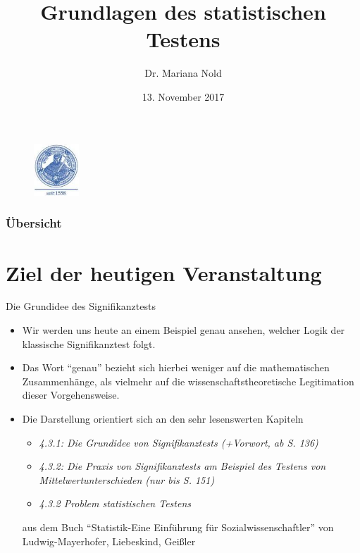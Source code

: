 \documentclass[usenames,dvipsnames,handout]{beamer}
\begin{document}
\author[Dr. Mariana Nold]{Dr. Mariana Nold}
 \date{}
\title [Grundlagen des statistischen Testens]{Grundlagen des statistischen Testens}
\date{13. November 2017}
\begin{frame}
\maketitle

  \begin{figure}[ht]
 	\centering
 	      \includegraphics[width=0.15\textwidth]{index.jpeg}
 	\end{figure}
\end{frame} 

\begin{frame}
  \frametitle{Übersicht}
  \tableofcontents
\end{frame}

\section{Ziel der heutigen Veranstaltung }


\begin{frame}{Die Grundidee des Signifikanztests}
\begin{itemize}
\item{Wir werden uns heute an einem Beispiel  genau ansehen, welcher Logik der klassische
Signifikanztest folgt. }\pause
\item{Das Wort ``genau'' bezieht sich hierbei weniger auf die mathematischen
Zusammenhänge, als vielmehr auf die wissenschaftstheoretische Legitimation dieser Vorgehensweise.}\pause
\item{Die Darstellung orientiert sich an den sehr lesenswerten Kapiteln 
\begin{itemize}
\item{\textit{4.3.1: Die Grundidee von Signifikanztests (+Vorwort, ab S. 136)}}
\item{\textit{4.3.2: Die Praxis von Signifikanztests am Beispiel des Testens von Mittelwertunterschieden (nur bis S. 151)}}
\item{\textit{4.3.2 Problem statistischen Testens}}
\end{itemize} aus dem Buch ``Statistik-Eine Einführung für Sozialwissenschaftler'' von Ludwig-Mayerhofer, Liebeskind, Geißler
 }
\end{itemize}
\end{frame}
\end{document}
